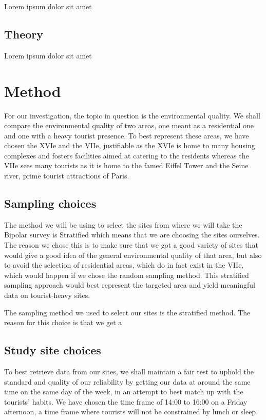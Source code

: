 \documentclass[11pt,letterpaper]{article}
\begin{document}
Lorem ipsum dolor sit amet

\subsection{Theory}

Lorem ipsum dolor sit amet

\section{Method}


For our investigation, the topic in question is the environmental quality. We shall compare the environmental quality of two areas, one meant as a residential one and one with a heavy tourist presence. To best represent these areas, we have chosen the XVIe and the VIIe, justifiable as the XVIe is home to many housing complexes and fosters facilities aimed at catering to the residents whereas the VIIe sees many tourists as it is home to the famed Eiffel Tower and the Seine river, prime tourist attractions of Paris.


\subsection{Sampling choices}

The method we will be using to select the sites from where we will take the Bipolar survey is Stratified which means that we are choosing the sites ourselves. The reason we chose this is to make sure that we got a good variety of sites that would give a good idea of the general environmental quality of that area, but also to avoid the selection of residential areas, which do in fact exist in the VIIe, which would happen if we chose the random sampling method. This stratified sampling approach would best represent the targeted area and yield meaningful data on tourist-heavy sites.

The sampling method we used to select our sites is the stratified method. The reason for this choice is that we get a 

\subsection{Study site choices}

To best retrieve data from our sites, we shall maintain a fair test to uphold the standard and quality of our reliability by getting our data at around the same time on the same day of the week, in an attempt to best match up with the tourists’ habits. We have chosen the time frame of 14:00 to 16:00 on a Friday afternoon, a time frame where tourists will not be constrained by lunch or sleep.
\end{document}
